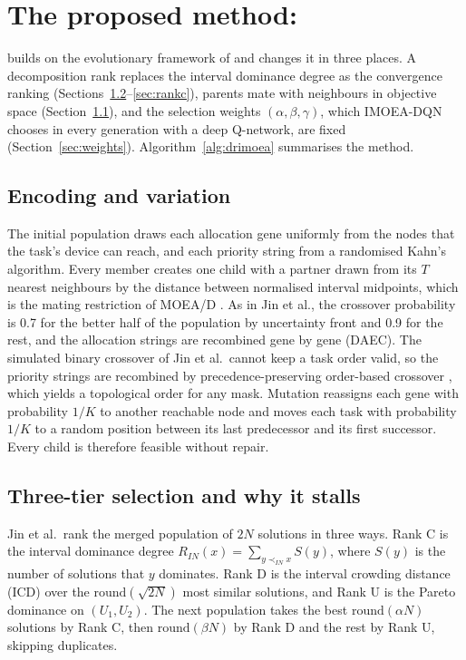 \section{The proposed method: \ours{}}
\label{sec:method}

\ours{} builds on the evolutionary framework of \citet{jin2026imoeadqn} and changes it in three places. A
decomposition rank replaces the interval dominance degree as the convergence ranking
(Sections~\ref{sec:stall}--\ref{sec:rankc}), parents mate with neighbours in objective space
(Section~\ref{sec:variation}), and the selection weights $(\alpha, \beta, \gamma)$, which IMOEA-DQN chooses in every
generation with a deep Q-network, are fixed (Section~\ref{sec:weights}). Algorithm~\ref{alg:drimoea} summarises the
method.



\subsection{Encoding and variation}
\label{sec:variation}
The initial population draws each allocation gene uniformly from the nodes that the task's device can reach, and each
priority string from a randomised Kahn's algorithm. Every member creates one child with a partner drawn from its $T$
nearest neighbours by the distance between normalised interval midpoints, which is the mating restriction of MOEA/D
\citep{zhang2007moead}. As in Jin et al., the crossover probability is 0.7 for the better half of the population by
uncertainty front and 0.9 for the rest, and the allocation strings are recombined gene by gene (DAEC). The simulated
binary crossover of Jin et al.\ cannot keep a task order valid, so the priority strings are recombined by
precedence-preserving order-based crossover \citep{bierwirth1996permutation}, which yields a topological order for any
mask. Mutation reassigns each gene with probability $1/K$ to another reachable node and moves each task with probability
$1/K$ to a random position between its last predecessor and its first successor. Every child is therefore feasible
without repair.

\subsection{Three-tier selection and why it stalls}
\label{sec:stall}
Jin et al.\ rank the merged population of $2N$ solutions in three ways. Rank C is the interval dominance degree
$R_{IN}(x) = \sum_{y \prec_{IN} x} S(y)$, where $S(y)$ is the number of solutions that $y$ dominates. Rank D is the
interval crowding distance (ICD) over the $\mathrm{round}(\sqrt{2N})$ most similar solutions, and Rank U is the Pareto
dominance on $(U_1, U_2)$. The next population takes the best $\mathrm{round}(\alpha N)$ solutions by Rank C, then
$\mathrm{round}(\beta N)$ by Rank D and the rest by Rank U, skipping duplicates.

